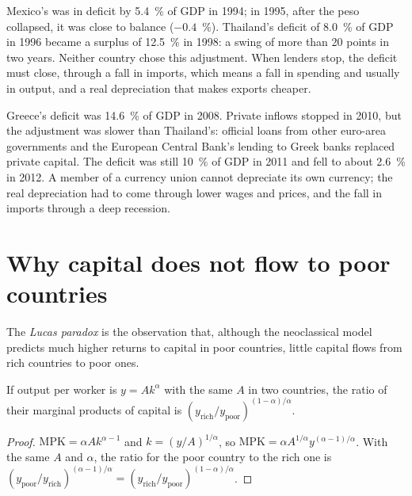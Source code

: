 \begin{record}
Mexico's  was in deficit by 5.4~\% of GDP in 1994; in 1995, after the
peso collapsed, it was close to balance ($-0.4$~\%). Thailand's deficit of 8.0~\% of
GDP in 1996 became a surplus of 12.5~\% in 1998: a swing of more than 20 points in two
years. Neither country chose this adjustment. When lenders stop, the deficit must
close, through a fall in imports, which means a fall in spending and usually in
output, and a real depreciation that makes exports cheaper.
\end{record}

\begin{record}
Greece's deficit was 14.6~\% of GDP in 2008. Private inflows stopped in 2010, but
the adjustment was slower than Thailand's: official loans from other euro-area
governments and the European Central Bank's lending to Greek banks replaced
private capital. The deficit was still 10~\% of GDP in 2011 and fell to about 2.6~\% in
2012. A member of a currency union cannot depreciate its own currency; the real
depreciation had to come through lower wages and prices, and the fall in imports
through a deep recession.
\end{record}

\section{Why capital does not flow to poor countries}\label{sec:b3:current-account:lucas}

\begin{definition}\label{def:b3:current-account:lucas-paradox}
The \emph{Lucas paradox} is the observation that, although the neoclassical model
predicts much higher returns to capital in poor countries, little capital flows
from rich countries to poor ones.
\end{definition}

\begin{proposition}\label{prop:b3:current-account:lucas}
If output per worker is $y = Ak^\alpha$ with the same $A$ in two countries, the ratio of
their marginal products of capital is $(y_{\mathrm{rich}}/y_{\mathrm{poor}})^{(1-\alpha)/\alpha}$.
\end{proposition}

\begin{proof}
$\mathrm{MPK} = \alpha A k^{\alpha - 1}$ and $k = (y/A)^{1/\alpha}$, so $\mathrm{MPK} = \alpha A^{1/\alpha}y^{(\alpha - 1)/\alpha}$.
With the same $A$ and $\alpha$, the ratio for the poor country to the rich one is
$(y_{\mathrm{poor}}/y_{\mathrm{rich}})^{(\alpha-1)/\alpha} = (y_{\mathrm{rich}}/y_{\mathrm{poor}})^{(1-\alpha)/\alpha}$.
\end{proof}


